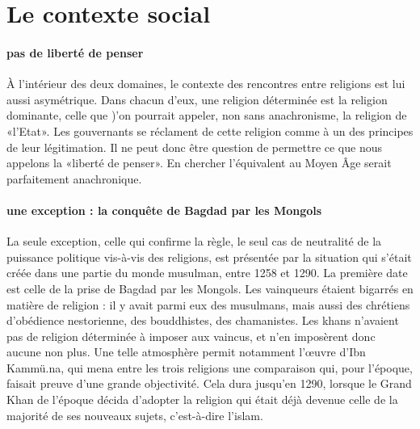 \section{Le contexte social}

\paragraph{pas de liberté de penser}
À l'intérieur des deux domaines, le contexte des rencontres entre religions est lui aussi asymétrique. Dans chacun d'eux, une religion déterminée est la religion dominante, celle que )'on pourrait appeler, non sans anachronisme, la religion de «l'Etat». Les
gouvernants se réclament de cette religion comme à un des principes de leur légitimation. Il ne peut donc être question de permettre ce que nous appelons la «liberté de penser». En chercher l'équivalent au Moyen Âge serait parfaitement anachronique.

\paragraph{une exception : la conquête de Bagdad par les Mongols}
La seule exception, celle qui confirme la règle, le seul cas de neutralité de la puissance politique vis-à-vis des religions, est présentée par la situation qui s'était créée dans une partie du monde musulman, entre 1258 et 1290. La première date est celle de la prise de Bagdad par les Mongols. Les vainqueurs étaient bigarrés en matière de religion : il y avait parmi eux des musulmans, mais aussi des chrétiens d'obédience nestorienne, des bouddhistes, des chamanistes. Les khans n'avaient pas de religion déterminée à imposer aux vaincus, et n'en imposèrent donc aucune non plus. Une telle atmosphère permit notamment l'œuvre d'Ibn Kammü.na, qui mena entre les trois religions une comparaison qui, pour l'époque, faisait preuve d'une grande objectivité. Cela dura jusqu'en 1290, lorsque le Grand Khan de l'époque décida d'adopter la religion qui était déjà devenue celle de la majorité de ses nouveaux sujets, c'est-à-dire l'islam.

